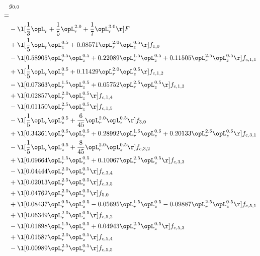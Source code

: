 \begin{alignat}{2} 
\label{eq:g_00_0} 
& g_{0,0} \nonumber \\ 
 = \\ 
& - \l[ \frac{1}{3} \opL_r + \frac{1}{5} \opL_r^{2.0} + \frac{1}{7} \opL_r^{3.0}  \r] F \nonumber \\ 
& + \l[ \frac{1}{5} \opL_r \opL_z^{0.5} +  0.08571 \opL_r^{2.0} \opL_z^{0.5}  \r] f_{1,0} \nonumber \\ 
& - \l[  0.58905 \opL_r^{0.5} \opL_z^{0.5} +  0.22089 \opL_r^{1.5} \opL_z^{0.5} +  0.11505 \opL_r^{2.5} \opL_z^{0.5}  \r] f_{c,1,1} \nonumber \\ 
& + \l[ \frac{1}{5} \opL_r \opL_z^{0.5} +  0.11429 \opL_r^{2.0} \opL_z^{0.5}  \r] f_{c,1,2} \nonumber \\ 
& - \l[  0.07363 \opL_r^{1.5} \opL_z^{0.5} +  0.05752 \opL_r^{2.5} \opL_z^{0.5}  \r] f_{c,1,3} \nonumber \\ 
& + \l[  0.02857 \opL_r^{2.0} \opL_z^{0.5}  \r] f_{c,1,4} \nonumber \\ 
& - \l[  0.01150 \opL_r^{2.5} \opL_z^{0.5}  \r] f_{c,1,5} \nonumber \\ 
& - \l[ \frac{1}{5} \opL_r \opL_z^{0.5} + \frac{6}{45} \opL_r^{2.0} \opL_z^{0.5}  \r] f_{3,0} \nonumber \\ 
& + \l[  0.34361 \opL_r^{0.5} \opL_z^{0.5} +  0.28992 \opL_r^{1.5} \opL_z^{0.5} +  0.20133 \opL_r^{2.5} \opL_z^{0.5}  \r] f_{c,3,1} \nonumber \\ 
& - \l[ \frac{1}{5} \opL_r \opL_z^{0.5} + \frac{8}{45} \opL_r^{2.0} \opL_z^{0.5}  \r] f_{c,3,2} \nonumber \\ 
& + \l[  0.09664 \opL_r^{1.5} \opL_z^{0.5} +  0.10067 \opL_r^{2.5} \opL_z^{0.5}  \r] f_{c,3,3} \nonumber \\ 
& - \l[  0.04444 \opL_r^{2.0} \opL_z^{0.5}  \r] f_{c,3,4} \nonumber \\ 
& + \l[  0.02013 \opL_r^{2.5} \opL_z^{0.5}  \r] f_{c,3,5} \nonumber \\ 
& + \l[  0.04762 \opL_r^{2.0} \opL_z^{0.5}  \r] f_{5,0} \nonumber \\ 
& + \l[  0.08437 \opL_r^{0.5} \opL_z^{0.5}   -0.05695 \opL_r^{1.5} \opL_z^{0.5}   -0.09887 \opL_r^{2.5} \opL_z^{0.5}  \r] f_{c,5,1} \nonumber \\ 
& + \l[  0.06349 \opL_r^{2.0} \opL_z^{0.5}  \r] f_{c,5,2} \nonumber \\ 
& - \l[  0.01898 \opL_r^{1.5} \opL_z^{0.5} +  0.04943 \opL_r^{2.5} \opL_z^{0.5}  \r] f_{c,5,3} \nonumber \\ 
& + \l[  0.01587 \opL_r^{2.0} \opL_z^{0.5}  \r] f_{c,5,4} \nonumber \\ 
& - \l[  0.00989 \opL_r^{2.5} \opL_z^{0.5}  \r] f_{c,5,5} \nonumber \\ 
\end{alignat} 


